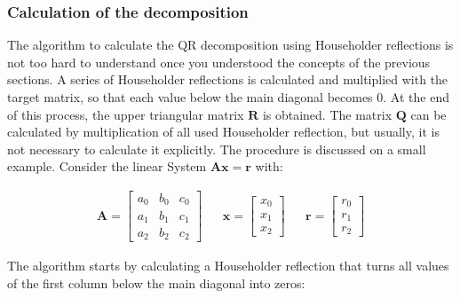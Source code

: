
\subsubsection{Calculation of the decomposition}


The algorithm to calculate the QR decomposition using Householder reflections is not too hard to understand once you understood the concepts of the previous sections.
A series of Householder reflections is calculated and multiplied with the target matrix, so that each value below the main diagonal becomes 0.
At the end of this process, the upper triangular matrix $\mathbf{R}$ is obtained.
The matrix $\mathbf{Q}$ can be calculated by multiplication of all used Householder reflection, but usually, it is not necessary to calculate it explicitly.
The procedure is discussed on a small example.
Consider the linear System $\mathbf{Ax} = \mathbf{r}$ with:

\begin{align*}
\mathbf{A}
=
\begin{bmatrix}
a_0&b_0&c_0\\
a_1&b_1&c_1\\
a_2&b_2&c_2
\end{bmatrix}
&&
\mathbf{x}
=
\begin{bmatrix}
x_0\\
x_1\\
x_2
\end{bmatrix}
&&
\mathbf{r}
=
\begin{bmatrix}
r_0\\
r_1\\
r_2
\end{bmatrix}
\end{align*}

The algorithm starts by calculating a Householder reflection that turns all values of the first column below the main diagonal into zeros:

